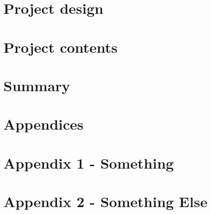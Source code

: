 \documentclass[12pt, a4paper]{report}
\begin{document}
    \chapter{Project design}\label{ch:project-design}
    

    \chapter{Project contents}\label{ch:project-contents}
    

    \chapter{Summary}\label{ch:summary}
    

    \pagebreak
    \printbibliography

    \pagebreak
    \appendix
    \chapter*{Appendices}
    \renewcommand{\thechapter}{\arabic{chapter}}

    \label{chapter:appendix-one}
    {\let\clearpage\relax\chapter*{Appendix 1 - Something}}
    

    \clearpage
    \label{chapter:appendix-something-else}
    \chapter*{Appendix 2 - Something Else}
    
\end{document}
